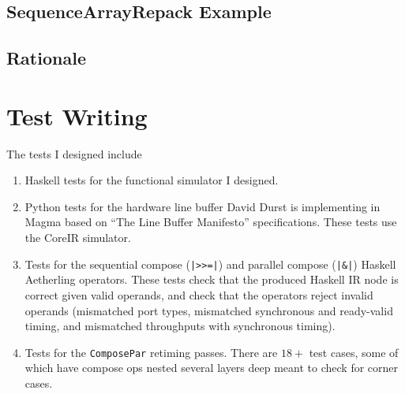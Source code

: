 \documentclass[12pt]{article}
\begin{document}
\subsection{SequenceArrayRepack Example}

\subsection{Rationale}

\section{Test Writing}

The tests I designed include
\begin{enumerate}
\item

Haskell tests for the functional simulator I designed.

\item

Python tests for the hardware line buffer David Durst is
implementing in Magma based on ``The Line Buffer Manifesto''
specifications. These tests use the CoreIR simulator.

\item

Tests for the sequential compose (\texttt{|>>=|}) and parallel
compose (\texttt{|\&|}) Haskell Aetherling operators. These tests
check that the produced Haskell IR node is correct given valid
operands, and check that the operators reject invalid operands
(mismatched port types, mismatched synchronous and ready-valid
timing, and mismatched throughputs with synchronous timing).

\item Tests for the \texttt{ComposePar} retiming passes. There are
$18+$ test cases, some of which have compose ops nested several
layers deep meant to check for corner cases.
\end{enumerate}
\end{document}
